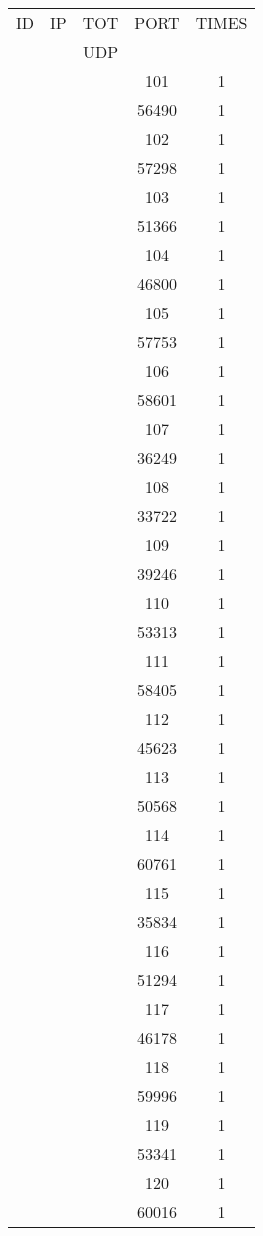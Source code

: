 \documentclass[a4paper]{scrartcl}
\begin{document}
\begin{minipage}[b]{0.5\linewidth}
\begin{tabular}{| c | c | c | c | c |}
\hline
ID & IP & TOT & PORT & TIMES \\ 
   &    & UDP &      &       \\ 
\hline
& & & 101 & 1 \\ & & & 56490 & 1 \\ & & & 102 & 1 \\ & & & 57298 & 1 \\ & & & 103 & 1 \\ & & & 51366 & 1 \\ & & & 104 & 1 \\ & & & 46800 & 1 \\ & & & 105 & 1 \\ & & & 57753 & 1 \\ & & & 106 & 1 \\ & & & 58601 & 1 \\ & & & 107 & 1 \\ & & & 36249 & 1 \\ & & & 108 & 1 \\ & & & 33722 & 1 \\ & & & 109 & 1 \\ & & & 39246 & 1 \\ & & & 110 & 1 \\ & & & 53313 & 1 \\ & & & 111 & 1 \\ & & & 58405 & 1 \\ & & & 112 & 1 \\ & & & 45623 & 1 \\ & & & 113 & 1 \\ & & & 50568 & 1 \\ & & & 114 & 1 \\ & & & 60761 & 1 \\ & & & 115 & 1 \\ & & & 35834 & 1 \\ & & & 116 & 1 \\ & & & 51294 & 1 \\ & & & 117 & 1 \\ & & & 46178 & 1 \\ & & & 118 & 1 \\ & & & 59996 & 1 \\ & & & 119 & 1 \\ & & & 53341 & 1 \\ & & & 120 & 1 \\ & & & 60016 & 1 \\ \hline\end{tabular}\end{minipage} \hfill\begin{minipage}[b]{0.5\linewidth}\begin{tabular}{| c | c | c | c | c |}

\end{tabular}
\end{minipage}
\end{document}
